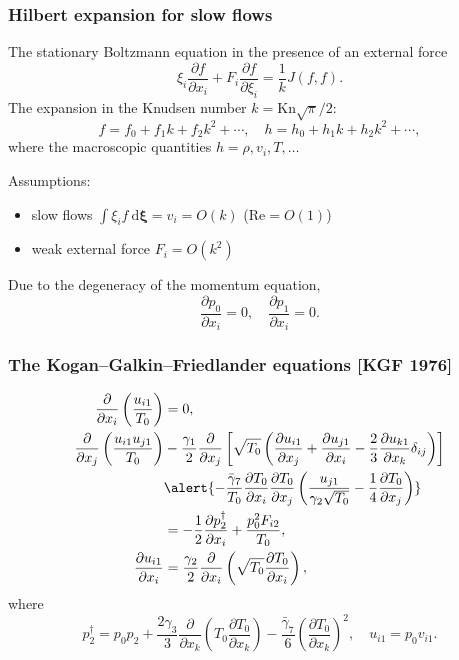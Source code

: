 \documentclass[mathserif]{beamer} %
\newcommand{\Kn}{\mathrm{Kn}}
\newcommand{\dd}{\:\mathrm{d}}
\newcommand{\pder}[2][]{\frac{\partial#1}{\partial#2}}
\newcommand{\dxi}{\boldsymbol{\dd\xi}}
\newcommand{\OO}[1]{O(#1)}
\begin{document}
\begin{frame}
    \frametitle{Hilbert expansion for slow flows}
    The stationary Boltzmann equation in the presence of an external force
    \begin{equation}\label{eq:Boltzmann}
        \xi_i\pder[f]{x_i} + F_i\pder[f]{\xi_i} = \frac1k J(f,f).
    \end{equation}
    The expansion in the Knudsen number \(k=\Kn\sqrt\pi/2\):
    \begin{equation}\label{eq:expansion}
        f = f_0 + f_1k + f_2k^2 + \cdots, \quad h = h_0 + h_1k + h_2k^2 + \cdots,
    \end{equation}
    where the macroscopic quantities \(h = \rho, v_i, T, \dots\)
    \vspace{5pt}\pause

    Assumptions:
    \begin{itemize}
        \item slow flows \(\int\xi_i f\dxi = v_i = \OO{k}\) (\(\mathrm{Re} = \OO{1}\))
        \item weak external force \(F_i = \OO{k^2}\)
    \end{itemize}
    Due to the degeneracy of the momentum equation,
    \begin{equation}
        \pder[p_0]{x_i} = 0, \quad \pder[p_1]{x_i} = 0.
    \end{equation}
\end{frame}

\begin{frame}
    \frametitle{The Kogan--Galkin--Friedlander equations [KGF 1976]}
    \begin{align}
        \pder{x_i}\left(\frac{u_{i1}}{T_0}\right) &= 0, \label{eq:asymptotic1} \\
        \pder{x_j}\left(\frac{u_{i1}u_{j1}}{T_0}\right)
            &-\frac{\gamma_1}2\pder{x_j}\left[\sqrt{T_0}\left(
                \pder[u_{i1}]{x_j} + \pder[u_{j1}]{x_i} - \frac23\pder[u_{k1}]{x_k}\delta_{ij}
            \right)\right] \notag\\
            &\alert{- \frac{\bar{\gamma}_7}{T_0}\pder[T_0]{x_i}\pder[T_0]{x_j}
                \left(\frac{u_{j1}}{\gamma_2\sqrt{T_0}} - \frac{1}4\pder[T_0]{x_j}\right)} \notag\\
            &= -\frac12\pder[p_2^\dag]{x_i} + \frac{p_0^2 F_{i2}}{T_0}, \label{eq:asymptotic2} \\
        \pder[u_{i1}]{x_i} &= \frac{\gamma_2}2\pder{x_i}\left(\sqrt{T_0}\pder[T_0]{x_i}\right), \label{eq:asymptotic3}
    \end{align}
    where
    \begin{equation}\label{eq:dag_pressure}
        p_2^\dag = p_0 p_2
            + \frac{2\gamma_3}{3}\pder{x_k}\left(T_0\pder[T_0]{x_k}\right)
            - \frac{\bar{\gamma}_7}{6}\left(\pder[T_0]{x_k}\right)^2, \quad u_{i1} = p_0v_{i1}.
    \end{equation}
\end{frame}
\end{document}
